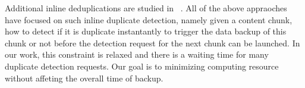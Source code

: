 Additional inline deduplications are studied in ~\cite{idedup}. All of the above appraoches have focused on
such inline duplicate detection, namely given a content chunk, how to detect if it is duplicate instantantly
to trigger the data backup of this chunk or not before the detection request for the next chunk can be launched. 
In our work, this constraint is relaxed and 
there is a waiting time for many duplicate detection requests. Our goal is to minimizing  computing  resource without
affeting the overall time of backup. 
